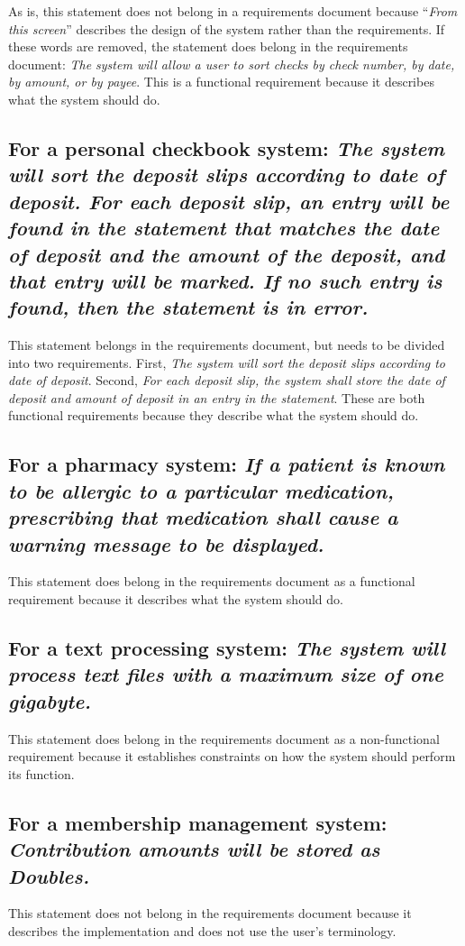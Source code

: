\documentclass[11pt]{article}
\begin{document}
As is, this statement does not belong in a requirements document because ``\textit{From this screen}'' describes the design of the system rather than the requirements.  If these words are removed, the statement does belong in the requirements document: \textit{The system will allow a user to sort checks by check number, by date, by amount, or by payee}. This is a functional requirement because it describes what the system should do.

\subsection{For a personal checkbook system: \textit{The system will sort the deposit slips according to date of deposit. For each deposit slip, an entry will be found in the statement that matches the date of deposit and the amount of the deposit, and that entry will be marked. If no such entry is found, then the statement is in error.}}

This statement belongs in the requirements document, but needs to be divided into two requirements. First, \textit{The system will sort the deposit slips according to date of deposit}. Second, \textit{For each deposit slip, the system shall store the date of deposit and amount of deposit in an entry in the statement}. These are both functional requirements because they describe what the system should do.

\subsection{For a pharmacy system: \textit{If a patient is known to be allergic to a particular medication, prescribing that medication shall cause a warning message to be displayed.}}

This statement does belong in the requirements document as a functional requirement because it describes what the system should do. 

\subsection{For a text processing system: \textit{The system will process text files with a maximum size of one gigabyte.}}

This statement does belong in the requirements document as a non-functional requirement because it establishes constraints on how the system should perform its function.

\subsection{For a membership management system: \textit{Contribution amounts will be stored as Doubles.}}

This statement does not belong in the requirements document because it describes the implementation and does not use the user's terminology. 


\begin{singlespace}



\end{singlespace}
\end{document}
